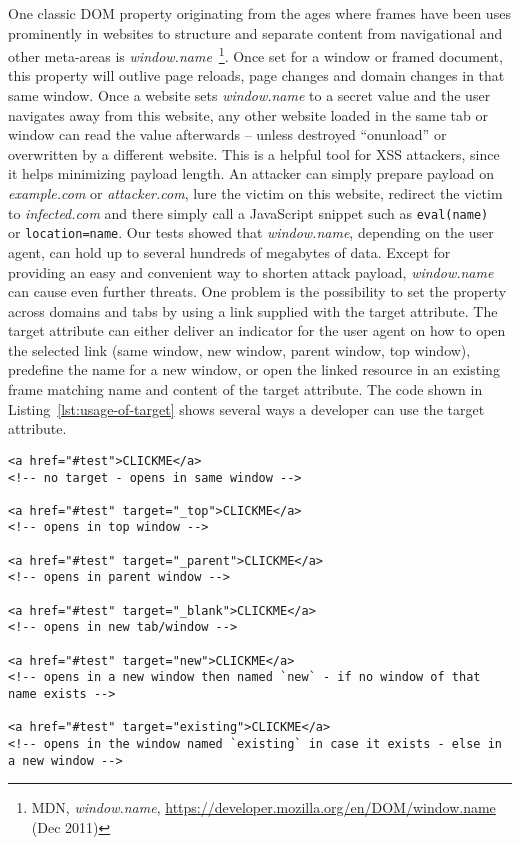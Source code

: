     One classic DOM property originating from the ages where frames have been uses prominently in websites to structure and separate content from navigational and other meta-areas is \textit{window.name}~\footnote{MDN, \textit{window.name}, \url{https://developer.mozilla.org/en/DOM/window.name} (Dec 2011)}. Once set for a window or framed document, this property will outlive page reloads, page changes and domain changes in that same window. Once a website sets \textit{window.name} to a secret value and the user navigates away from this website, any other website loaded in the same tab or window can read the value afterwards -- unless destroyed ``onunload'' or overwritten by a different website. This is a helpful tool for XSS attackers, since it helps minimizing payload length. An attacker can simply prepare payload on \textit{example.com} or \textit{attacker.com}, lure the victim on this website, redirect the victim to \textit{infected.com} and there simply call a JavaScript snippet such as \texttt{eval(name)
} or \texttt{location=name}. Our tests showed that \textit{window.name}, depending on the user agent, can hold up to several hundreds of megabytes of data. Except for providing an easy and convenient way to shorten attack payload, \textit{window.name} can cause even further threats. One problem is the possibility to set the property across domains and tabs by using a link supplied with the target attribute. The target attribute can either deliver an indicator for the user agent on how to open the selected link (same window, new window, parent window, top window), predefine the name for a new window, or open the linked resource in an existing frame matching name and content of the target attribute. The code shown in Listing~\ref{lst:usage-of-target} shows several ways a developer can use the target attribute.

\begin{lstlisting}[label=lst:usage-of-target,caption=Several use-cases for the target attribute causing different opening behavior scenarios,captionpos=b]
<a href="#test">CLICKME</a> 
<!-- no target - opens in same window -->

<a href="#test" target="_top">CLICKME</a> 
<!-- opens in top window -->

<a href="#test" target="_parent">CLICKME</a> 
<!-- opens in parent window -->

<a href="#test" target="_blank">CLICKME</a> 
<!-- opens in new tab/window -->

<a href="#test" target="new">CLICKME</a> 
<!-- opens in a new window then named `new` - if no window of that name exists -->

<a href="#test" target="existing">CLICKME</a> 
<!-- opens in the window named `existing` in case it exists - else in a new window -->
\end{lstlisting}


